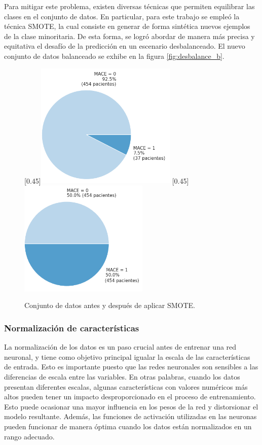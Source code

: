 Para mitigar este problema, existen diversas técnicas que permiten equilibrar las clases en el conjunto de datos. 
En particular, para este trabajo se empleó la técnica SMOTE, la cual consiste en generar de forma sintética nuevos 
ejemplos de la clase minoritaria. De esta forma, se logró abordar de manera más precisa y equitativa el desafío 
de la predicción en un escenario desbalanceado. El nuevo conjunto de datos balanceado se exhibe en la figura \ref{fig:desbalance_b}.


\begin{figure}[H]
	\centering
	\hspace{1em}
	[0.45\linewidth]{\includegraphics[height=6cm]{./Figures/desbalance_pie.png}}
	\hspace{1em}
	[0.45\linewidth]{\includegraphics[height=5.5cm]{./Figures/desbalance_smote_pie.png}}
	\caption{Conjunto de datos antes y después de aplicar SMOTE.}
\end{figure}

\subsubsection{Normalización de características}
La normalización de los datos es un paso crucial antes de entrenar una red neuronal, y tiene como 
objetivo principal igualar la escala de las características de entrada. Esto es importante puesto 
que las redes neuronales son sensibles a las diferencias de escala entre las variables. En otras 
palabras, cuando los datos presentan diferentes escalas, algunas características con valores numéricos 
más altos pueden tener un impacto desproporcionado en el proceso de entrenamiento. Esto puede ocasionar 
una mayor influencia en los pesos de la red y distorsionar el modelo resultante. 
Además, las funciones de activación utilizadas en las neuronas pueden funcionar de manera óptima 
cuando los datos están normalizados en un rango adecuado.

